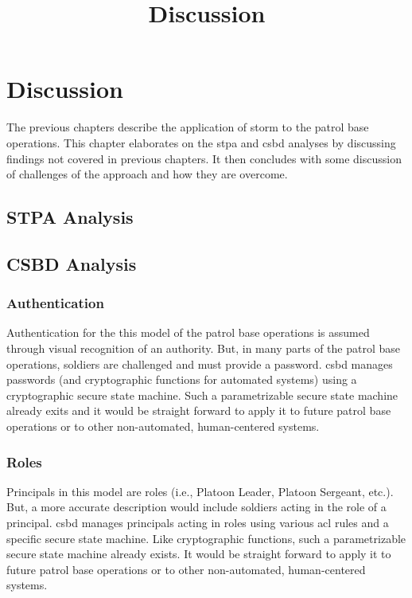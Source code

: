 \documentclass[../../main/main.tex]{subfiles}
\begin{document}
\title{Discussion}

\chapter{Discussion}\label{chp:discussion}
The previous chapters describe the application of \gls{storm} to the patrol base operations.  This chapter elaborates on the \gls{stpa} and \gls{csbd} analyses by discussing findings not covered in previous chapters.   It then concludes with some discussion of challenges of the approach and how they are overcome.


\section{STPA Analysis}\label{sec:stpadiscussion}

\section{CSBD Analysis}\label{sec:csbddiscussion}

\subsection{Authentication}
Authentication for the this model of the patrol base operations is assumed through visual recognition of an authority.  But, in many parts of the patrol base operations, soldiers are challenged and must provide a password.  \gls{csbd} manages passwords (and cryptographic functions for automated systems) using a cryptographic secure state machine.  Such a parametrizable secure state machine already exits and it would be straight forward to apply it to future patrol base operations or to other non-automated, human-centered systems.

\subsection{Roles}
Principals in this model are roles (i.e., Platoon Leader, Platoon Sergeant, etc.).  But, a more accurate description would include soldiers acting in the role of a principal.  \gls{csbd} manages principals acting in roles using various \gls{acl} rules and a specific secure state machine.  Like cryptographic functions, such a parametrizable secure state machine already exists.  It would be straight forward to apply it to future patrol base operations or to other non-automated, human-centered systems.
\end{document}
